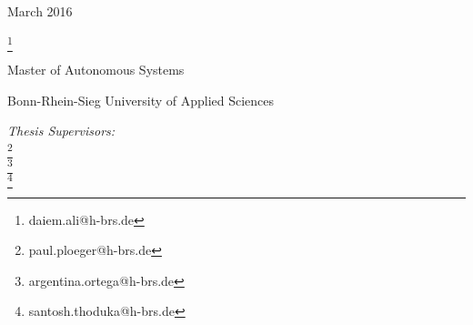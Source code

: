 \begin{titlepage}
\centering
\vspace*{1in}
\begin{LARGE}\bfseries
\PaperSubject \par
\end{LARGE}
\PaperTitle\par
\vspace{0.5in}
March 2016\\
\vspace{1.5in}
\begin{Large}
\href{\PaperMainWriterEMail}{\PaperMainWriter \footnote{\href{\PaperMainWriterEMail} {daiem.ali@h-brs.de}} 
} \par
\end{Large}
\vfill
\vspace{0.5in}
Master of Autonomous Systems
\par
Bonn-Rhein-Sieg University of Applied Sciences
\par
\vspace{0.5in}
\par
\emph{Thesis Supervisors:}\\
\href{\PaperLecturerEMail}{\PaperLecturer \footnote{\href{\PaperLecturerEMail} {paul.ploeger@h-brs.de}}}\\
\href{\SecondSupervisorEMail}{\SecondSupervisor \footnote{\href{\SecondSupervisorEMail} {argentina.ortega@h-brs.de}}}\\
\href{\ThirdSupervisorEMail}{\ThirdSupervisor \footnote{\href{\ThirdSupervisorEMail} {santosh.thoduka@h-brs.de}}}
\vfill
\end{titlepage}
